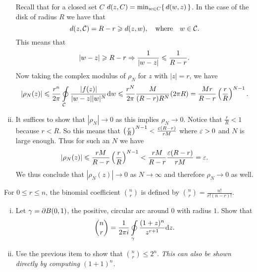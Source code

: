 \documentclass[12pt]{memoir}
\begin{document}
\begin{ptcbr}
\begin{enumerate}[i)]
\begin{center}
\begin{tikzpicture}[x=0.75pt,y=0.75pt,yscale=-1,xscale=1]
        
        \end{tikzpicture}
        
        


        \end{center}
        Recall that for a closed set $C$ $d(z,C)=\min_{w\in C}\set{d(w,z)}$. In the case of the disk of radius $R$ we have that 
        $$d(z,\cC)=R-r\geq d(z,w),\word{where}w\in\cC.$$
        This means that 
        $$|w-z|\geq R-r\To\frac{1}{|w-z|}\leq\frac{1}{R-r}.$$
        Now taking the complex modulus of $\rho_N$ for $z$ with $|z|=r$, we have
        $$|\rho_N(z)|\leq\frac{r^n}{2\pi}\oint\limits_\cC\frac{|f(z)|}{|w-z||w|^N}\dd w\leq \frac{r^N}{2\pi}\frac{M}{(R-r)R^N}(2\pi R)=\frac{Mr}{R-r}\left(\frac{r}{R}\right)^{N-1}.$$
        \item It suffices to show that $|\rho_N|\to 0$ as this implies $\rho_N\to0$. Notice that $\frac{r}{R}<1$ because $r<R$. So this means that $\left(\frac{r}{R}\right)^{N-1}<\frac{\eps(R-r)}{rM}$ where $\eps>0$ and $N$ is large enough. Thus for such an $N$ we have 
        $$|\rho_N(z)|\leq \frac{rM}{R-r}\left(\frac{r}{R}\right)^{N-1}<\frac{rM}{R-r}\frac{\eps(R-r)}{rM}=\eps.$$
        We thus conclude that $|\rho_N(z)|\to 0$ as $N\to\infty$ and therefore $\rho_N\to 0$ as well.
    \end{enumerate}
\end{ptcbr}
\begin{Ej}
    For $0\leq r\leq n$, the binomial coefficient $\binom{n}{r}$ is defined by $\binom{n}{r}=\frac{n!}{r!(n-r)!}$.
    \begin{enumerate}[i)]
        \itemsep=-0.4em
        \item Let $\ga=\del B(0,1)$, the positive, circular arc around $0$ with radius $1$. Show that 
        $$\binom{n}{r}=\frac{1}{2\pi i}\oint\limits_\ga \frac{(1+z)^n}{z^{r+1}}\dd z.$$
        \item Use the previous item to show that $\binom{n}{r}\leq 2^n$. \emph{This can also be shown directly by computing $(1+1)^n$.}
    \end{enumerate}
\end{Ej}
\end{document}
